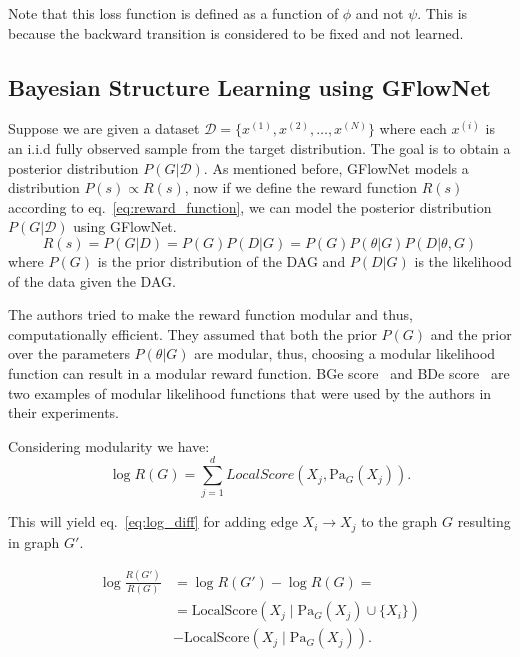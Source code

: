 \documentclass{lxaiproposal}
\begin{document}
    Note that this loss function is defined as a function of $\phi$ and not $\psi$. This is because the backward
    transition is considered to be fixed and not learned.

    \subsection{Bayesian Structure Learning using GFlowNet}

    Suppose we are given a dataset $\mathcal{D} = \{x^{(1)}, x^{(2)}, \ldots, x^{(N)}\}$ where each $x^{(i)}$ is an i.i.d
    fully observed sample from the target distribution. The goal is to obtain a posterior distribution
    $P(G|\mathcal{D})$.
    As mentioned before, GFlowNet models a distribution $P(s) \propto R(s)$, now if we define the reward function $R(s)$
    according to eq.~\eqref{eq:reward_function}, we can model the posterior distribution $P(G|\mathcal{D})$ using GFlowNet.
    \begin{equation}
        R(s) = P(G|D) = P(G)P(D|G) = P(G) P(\theta|G) P(D|\theta, G)
        \label{eq:reward_function}
    \end{equation}
    where $P(G)$ is the prior distribution of the DAG and $P(D|G)$ is the likelihood of the data given the DAG.

    The authors tried to make the reward function modular and thus, computationally efficient. They assumed that both the
    prior $P(G)$ and the prior over the parameters $P(\theta|G)$ are modular, thus, choosing a modular likelihood
    function can result in a modular reward function. BGe score~\cite{scutari2009bayesiannetworks} and
    BDe score~\cite{heckerman1995learningbayesiannetworks} are two examples of modular likelihood functions that
    were used by the authors in their experiments.

    Considering modularity we have:
    \begin{equation}
        \log R(G) = \sum_{j=1}^{d} LocalScore(X_j, \text{Pa}_G(X_j)).
        \label{eq:modular_reward}
    \end{equation}

    This will yield eq.~\eqref{eq:log_diff} for adding edge $X_i \to X_j$ to the graph $G$ resulting in graph $G'$.

    \begin{equation}
        \begin{aligned}
            \log \frac{R(G')}{R(G)} &= \log R(G') - \log R(G) =\\
            & = \text{LocalScore}(X_j \mid \text{Pa}_{G}(X_j)\cup \{X_i\}) \\
            &-\text{LocalScore}(X_j \mid \text{Pa}_{G}(X_j)).
        \end{aligned}
        \label{eq:log_diff}
    \end{equation}
\end{document}
